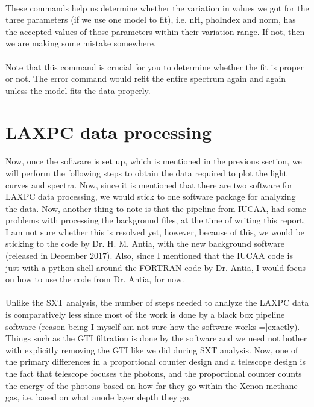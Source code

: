\documentclass[a4paper,twoside]{report}
\numberwithin{equation}{section}
\begin{document}
\paragraph{}
These commands help us determine whether the variation in values we got for the three parameters (if we use one model to fit), i.e. nH, phoIndex and norm, has the accepted values of those parameters within their variation range. If not, then we are making some mistake somewhere. 
\paragraph{}
Note that this command is crucial for you to determine whether the fit is proper or not. The error command would refit the entire spectrum again and again unless the model fits the data properly. 
\newpage
\section{LAXPC data processing}
\paragraph{}
Now, once the software is set up, which is mentioned in the previous section, we will perform the following steps to obtain the data required to plot the light curves and spectra. Now, since it is mentioned that there are two software for LAXPC data processing, we would stick to one software package for analyzing the data. Now, another thing to note is that the pipeline from IUCAA, had some problems with processing the background files, at the time of writing this report, I am not sure whether this is resolved yet, however, because of this, we would be sticking to the code by Dr. H. M. Antia, with the new background software (released in December $2017$). Also, since I mentioned that the IUCAA code is just with a python shell around the FORTRAN code by Dr. Antia, I would  focus on how to use the code from Dr. Antia, for now. 
\paragraph{}
Unlike the SXT analysis, the number of steps needed to analyze the LAXPC data is comparatively less since most of the work is done by a black box pipeline software (reason being I myself am not sure how the software works =]exactly). Things such as the GTI filtration is done by the software and we need not bother with explicitly removing the GTI like we did during SXT analysis. Now, one of the primary differences in a proportional counter design and a telescope design is the fact that telescope focuses the photons, and the proportional counter counts the energy of the photons based on how far they go within the Xenon-methane gas, i.e. based on what anode layer depth they go. 
\end{document}
